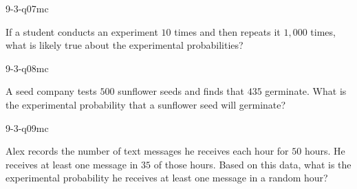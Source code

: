 \begin{practiceQuestion}{9-3-q07}{mc}
\begin{questionText}
If a student conducts an experiment $10$ times and then repeats it $1{,}000$ times, what is likely true about the experimental probabilities?
\end{questionText}
\end{practiceQuestion}

\begin{practiceQuestion}{9-3-q08}{mc}
\begin{questionText}
A seed company tests $500$ sunflower seeds and finds that $435$ germinate. What is the experimental probability that a sunflower seed will germinate?
\end{questionText}
\end{practiceQuestion}

\begin{practiceQuestion}{9-3-q09}{mc}
\begin{questionText}
Alex records the number of text messages he receives each hour for $50$ hours. He receives at least one message in $35$ of those hours. Based on this data, what is the experimental probability he receives at least one message in a random hour?
\end{questionText}
\end{practiceQuestion}

